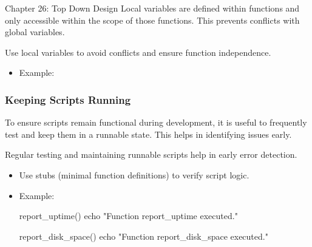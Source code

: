 \begin{notes}{Chapter 26: Top Down Design}
    Local variables are defined within functions and only accessible within the scope of those functions. This prevents conflicts with global variables.
    
    \begin{highlight}
    
    Use local variables to avoid conflicts and ensure function independence.
    
    \begin{itemize}
        \item Example:
    \end{itemize}
    
    \end{highlight}
    
    \subsubsection*{Keeping Scripts Running}
    
    To ensure scripts remain functional during development, it is useful to frequently test and keep them in a runnable state. This helps in identifying issues early.
    
    \begin{highlight}
    
    Regular testing and maintaining runnable scripts help in early error detection.
    
    \begin{itemize}
        \item Use stubs (minimal function definitions) to verify script logic.
        \item Example:
    \begin{code}[Shell]
    report_uptime() {
        echo "Function report_uptime executed."
    }
    
    report_disk_space() {
        echo "Function report_disk_space executed."
    }
    

\end{code}
\end{itemize}
\end{highlight}
\end{notes}
